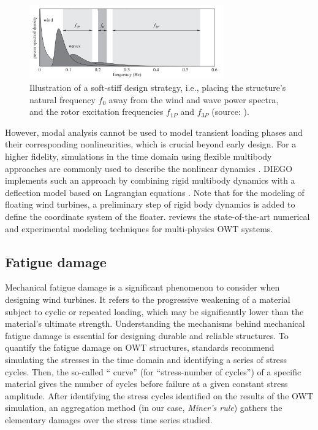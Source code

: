 \begin{figure}
    \centering
    \includegraphics[width=0.75\textwidth]{./part1/figures/modal_analysis.png}
    \caption{Illustration of a soft-stiff design strategy, i.e., placing the structure's natural frequency $f_0$ away from the wind and wave power spectra, and the rotor excitation frequencies $f_{1P}$ and $f_{3P}$ (source: \citealp{kallehave_2015_modal}).}
    \label{fig:modal_analysis}
\end{figure}

However, modal analysis cannot be used to model transient loading phases and their corresponding nonlinearities, which is crucial beyond early design. 
For a higher fidelity, simulations in the time domain using flexible multibody approaches are commonly used to describe the nonlinear dynamics \citep{holm_2009_multibody,alsolihat_2018_flexible_multibody}. 
DIEGO implements such an approach by combining rigid multibody dynamics with a deflection model based on Lagrangian equations \citep{milano_thesis_2021}. 
Note that for the modeling of floating wind turbines, a preliminary step of rigid body dynamics is added to define the coordinate system of the floater. 
\citet{otter_2022_owt_modeling_review} reviews the state-of-the-art numerical and experimental modeling techniques for multi-physics OWT systems. 


\subsection{Fatigue damage}\label{sec:235}

Mechanical fatigue damage is a significant phenomenon to consider when designing wind turbines. 
It refers to the progressive weakening of a material subject to cyclic or repeated loading, which may be significantly lower than the material's ultimate strength. 
Understanding the mechanisms behind mechanical fatigue damage is essential for designing durable and reliable structures. 
To quantify the fatigue damage on OWT structures, standards \citep{dnv_fatigue_2016} recommend simulating the stresses in the time domain and identifying a series of stress cycles. 
Then, the so-called `` curve'' (for ``stress-number of cycles'') of a specific material gives the number of cycles before failure at a given constant stress amplitude. 
After identifying the stress cycles identified on the results of the OWT simulation, an aggregation method (in our case, \textit{Miner's rule}) gathers the elementary damages over the stress time series studied. 


